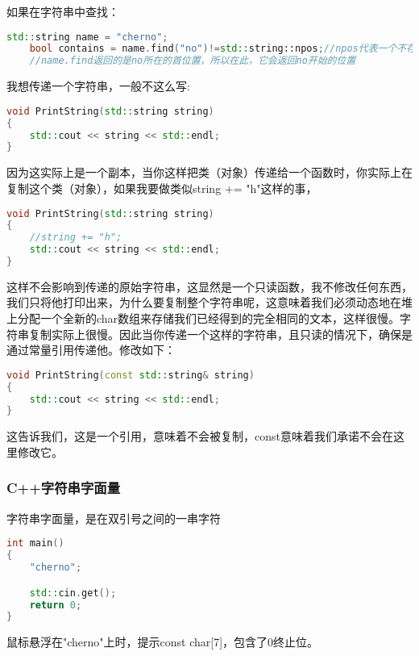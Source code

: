 如果在字符串中查找：

\begin{lstlisting}[language=c++]
    std::string name = "cherno";
    bool contains = name.find("no")!=std::string::npos;//npos代表一个不存在的位置
    //name.find返回的是no所在的首位置，所以在此，它会返回no开始的位置
\end{lstlisting}

我想传递一个字符串，一般不这么写:

\begin{lstlisting}[language=c++]
void PrintString(std::string string)
{
    std::cout << string << std::endl;
}
\end{lstlisting}

因为这实际上是一个副本，当你这样把类（对象）传递给一个函数时，你实际上在复制这个类（对象），如果我要做类似{\ncodestyle string += "h"}这样的事，

\begin{lstlisting}[language=c++]
void PrintString(std::string string)
{
    //string += "h";
    std::cout << string << std::endl;
}
\end{lstlisting}

这样不会影响到传递的原始字符串，这显然是一个只读函数，我不修改任何东西，我们只将他打印出来，为什么要复制整个字符串呢，这意味着我们必须动态地在堆上分配一个全新的{\ncodestyle char}数组来存储我们已经得到的完全相同的文本，这样很慢。字符串复制实际上很慢。因此当你传递一个这样的字符串，且只读的情况下，确保是通过常量引用传递他。修改如下：

\begin{lstlisting}[language=c++]
void PrintString(const std::string& string)
{
    std::cout << string << std::endl;
}
\end{lstlisting}

这告诉我们，这是一个引用，意味着不会被复制，{\ncodestyle const}意味着我们承诺不会在这里修改它。

\subsubsection{C++字符串字面量}

字符串字面量，是在双引号之间的一串字符

\begin{lstlisting}[language=c++]
int main()
{
    "cherno";

    std::cin.get();
    return 0;
}
\end{lstlisting}

鼠标悬浮在{\ncodestyle "cherno"}上时，提示{\ncodestyle const char[7]}，包含了0终止位。

